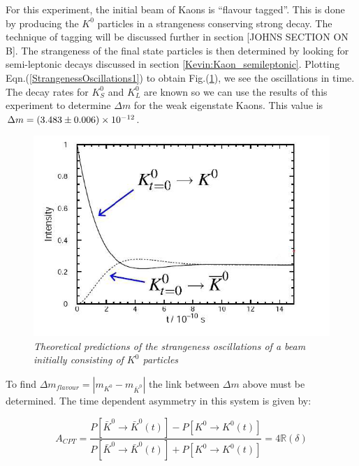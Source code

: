 For this experiment, the initial beam of Kaons is ``flavour tagged''. This is done by producing the $K^{0}$ particles in a strangeness conserving strong decay. The technique of tagging will be discussed further in section [JOHNS SECTION ON B]. The strangeness of the final state particles is then determined by looking for semi-leptonic decays discussed in section \ref{Kevin:Kaon_semileptonic}. Plotting Eqn.(\ref{StrangenessOscillations1}) to obtain Fig.(\ref{StrangenessOscillationsPic}), we see the oscillations in time. The decay rates for $K^{0}_{S}$ and $K^{0}_{L}$ are known so we can use the results of this experiment to determine $\Delta m$ for the weak eigenstate Kaons. This value is $\Delta m = (3.483 \pm 0.006) \times 10^{-12}$.       

\begin{figure}[h!]
\begin{center}
\includegraphics[scale=0.4]{figs/Strangeness_oscillations.png}
\end{center}
\caption{\textit{Theoretical predictions of the strangeness oscillations of a beam initially consisting of $K^{0}$ particles \cite{StrangenessPic}}}
\label{StrangenessOscillationsPic}
\end{figure}

To find ${\Delta m}_{flavour} = |m_{K^{0}} - m_{\bar{K}^{0}}|$ the link between $\Delta m$ above must be determined. The time dependent asymmetry in this system is given by:

\begin{equation*}
A_{CPT} = \frac{P[\bar{K}^{0} \rightarrow \bar{K}^{0}(t)] - P[{K}^{0} \rightarrow {K}^{0}(t)]}{P[\bar{K}^{0} \rightarrow \bar{K}^{0}(t)] + P[{K}^{0} \rightarrow {K}^{0}(t)]} = 4 \mathbb{R}({\delta})
\end{equation*}

